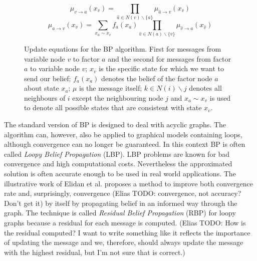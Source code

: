 \begin{figure}
\label{eqn:bp_message}
\begin{equation*}                                                            
\mu_{v\rightarrow a}(x_v) = \prod_{\hat a \in N(v)\backslash \{a\}} \mu_{\hat a\rightarrow v}(x_v)
\end{equation*}
\begin{equation*}                                                            
\mu_{a\rightarrow v}(x_v) = \sum_{x_a \sim x_v}f_a(x_a) \prod_{\hat v \in N(a)\backslash \{v\}} \mu_{\hat v\rightarrow a}(x_{\hat v})
\end{equation*}
\caption{Update equations for the BP algorithm. First for messages from variable node $v$ to factor $a$ and the second for messages from factor $a$ to variable node $v$; $x_v$ is the specific state for which we want to send our belief; $f_a(x_a)$ denotes the belief of the factor node $a$ about state $x_a$; $\mu$ is the message itself; $k \in N(i)\backslash j$ denotes all neighbours of $i$ except the neighbouring node $j$ and $x_a \sim x_v$ is used to denote all possible states that are consistent with state $x_v$.}
\end{figure}

The standard version of BP is designed to deal with acyclic graphs. The algorithm can, however, also be applied to graphical models containing loops, although convergence can no longer be guaranteed. In this context BP is often called \textit{Loopy Belief Propagation} (LBP). LBP problems are known for bad convergence and high computational costs. Nevertheless the approximated solution is often accurate enough to be used in real world applications. The illustrative work of Elidan et al. \cite{elidan2012residual} proposes a method to improve both convergence rate and, surprisingly, convergence (Elias TODO: convergence, not accuracy? Don't get it) by itself by propagating belief in an informed way through the graph. The technique is called \textit{Residual Belief Propagation} (RBP) for loopy graphs because a residual for each message is computed.
(Elias TODO: How is the residual computed? I want to write something like it reflects the importance of updating the message and we, therefore, should always update the message with the highest residual, but I'm not sure that is correct.)


